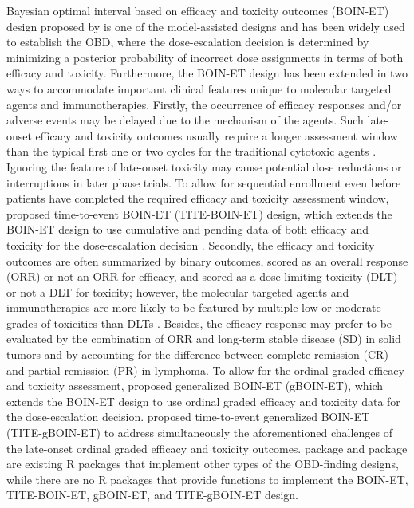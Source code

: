 Bayesian optimal interval based on efficacy and toxicity outcomes (BOIN-ET) design proposed by \citet{takeda:2018} is one of the model-assisted designs and has been widely used to establish the OBD, where the dose-escalation decision is determined by minimizing a posterior probability of incorrect dose assignments in terms of both efficacy and toxicity. Furthermore, the BOIN-ET design has been extended in two ways to accommodate important clinical features unique to molecular targeted agents and immunotherapies. Firstly, the occurrence of efficacy responses and/or adverse events may be delayed due to the mechanism of the agents. Such late-onset efficacy and toxicity outcomes usually require a longer assessment window than the typical first one or two cycles for the traditional cytotoxic agents \citep{postel:2009,weber:2015}. Ignoring the feature of late-onset toxicity may cause potential dose reductions or interruptions in later phase trials. To allow for sequential enrollment even before patients have completed the required efficacy and toxicity assessment window, \citet{takeda:2020} proposed time-to-event BOIN-ET (TITE-BOIN-ET) design, which extends the BOIN-ET design to use cumulative and pending data of both efficacy and toxicity for the dose-escalation decision \citep{lin:2020c}. Secondly, the efficacy and toxicity outcomes are often summarized by binary outcomes, scored as an overall response (ORR) or not an ORR for efficacy, and scored as a dose-limiting toxicity (DLT) or not a DLT for toxicity; however, the molecular targeted agents and immunotherapies are more likely to be featured by multiple low or moderate grades of toxicities than DLTs \citep{penel:2011}. Besides, the efficacy response may prefer to be evaluated by the combination of ORR and long-term stable disease (SD) in solid tumors and by accounting for the difference between complete remission (CR) and partial remission (PR) in lymphoma. To allow for the ordinal graded efficacy and toxicity assessment, \citet{takeda:2022b} proposed generalized BOIN-ET (gBOIN-ET), which extends the BOIN-ET design to use ordinal graded efficacy and toxicity data for the dose-escalation decision. \citet{takeda:2023} proposed time-to-event generalized BOIN-ET (TITE-gBOIN-ET) to address simultaneously the aforementioned challenges of the late-onset ordinal graded efficacy and toxicity outcomes.  package \citep{xiaomeng:2025} and  package \citep{kristian:2024} are existing R packages that implement other types of the OBD-finding designs, while there are no R packages that provide functions to implement the BOIN-ET, TITE-BOIN-ET, gBOIN-ET, and TITE-gBOIN-ET design.

